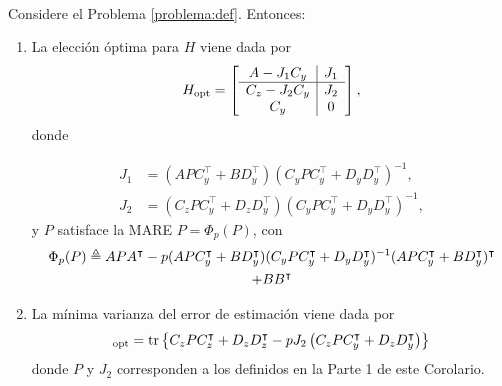\begin{coro}\label{coro:H-explicito}{\ \\}
Considere el Problema \ref{problema:def}. Entonces:
\begin{enumerate}
\item La elecci\'on \'optima para $H$ viene dada por
\begin{align}\label{eq:Hopt-demoaux}
H_{\operatorname{opt}} = \left[\begin{array}{c|c}A-J_1C_y & J_1 \\ \hline C_z-J_2C_y & J_2 \\ C_y & 0
\end{array}\right],
\end{align}
donde

\begin{subequations}\label{eq:Js}
\begin{align}
J_1 &= (APC_y^{\intercal}+BD_y^{\intercal}) (C_yPC_y^{\intercal} + D_yD_y^{\intercal} )^{-1}, \\
J_2 &= (C_zPC_y^{\intercal}+D_zD_y^{\intercal}) (C_yPC_y^{\intercal} + D_yD_y^{\intercal} )^{-1},
\end{align}
\end{subequations}
y $P$ satisface la MARE $P=\Phi_p\left(P\right)$, con
\begin{multline}
\label{eq:mare}
\Phi_p(P) \triangleq APA^{\intercal} -p(APC_y^{\intercal}+BD_y^{\intercal})(C_yPC_y^{\intercal}+D_yD_y^{\intercal})^{-1}(APC_y^{\intercal}+BD_y^{\intercal})^{\intercal}\\ + BB^{\intercal}
\end{multline}

\item La m\'inima varianza del error de estimaci\'on viene dada por
\begin{equation}
[\sigma_{\tilde{z}}^2]_{\opt} = \traza{ C_zPC_z^{\intercal} + D_zD_z^{\intercal} -pJ_2 \left( C_zPC_y^{\intercal} + D_zD_y^{\intercal} \right) }
\end{equation}
donde $P$ y $J_2$ corresponden a los definidos en la Parte 1 de este Corolario.
\end{enumerate}
\end{coro}

